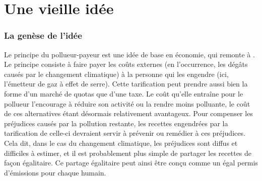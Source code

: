\documentclass[a5paper,french,openany]{memoir}
\begin{document}

\section{Une vieille idée} 

\subsubsection{La genèse de l'idée}
Le principe du pollueur-payeur est une idée de base en économie, qui remonte à \citet{pigou_economics_1920}. Le principe consiste à faire payer les coûts externes (en l'occurrence, les dégâts causés par le changement climatique) à la personne qui les engendre (ici, l'émetteur de gaz à effet de serre). Cette tarification peut prendre aussi bien la forme d'un marché de quotas que d'une taxe. Le coût qu'elle entraîne pour le pollueur l'encourage à réduire son activité ou la rendre moins polluante, le coût de ces alternatives étant désormais relativement avantageux. 
Pour compenser les préjudices causés par la pollution restante, les recettes engendrées par la tarification de celle-ci devraient servir à prévenir ou remédier à ces préjudices. 
Cela dit, dans le cas du changement climatique, les préjudices sont diffus et difficiles à estimer, et il est probablement plus simple de partager les recettes de façon égalitaire. Ce partage égalitaire peut ainsi être conçu comme un égal permis d'émissions pour chaque humain. 
\end{document}
